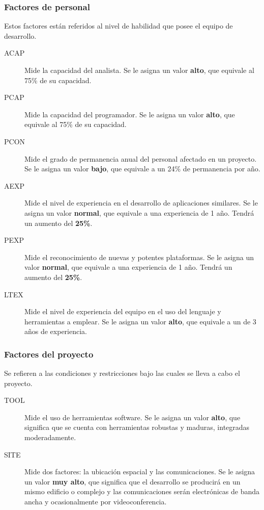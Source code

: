 \documentclass[11pt,a4paper,spanish,twoside]{book}
\begin{document}
\subsubsection{Factores de personal}
Estos factores están referidos al nivel de habilidad que posee el equipo de
desarrollo.
\begin{description}
\item[ACAP] Mide la capacidad del analista. Se le asigna un valor
\textbf{alto}, que equivale al 75\% de su capacidad.
\item[PCAP] Mide la capacidad del programador. Se le asigna un valor
\textbf{alto}, que equivale al 75\% de su capacidad.
\item[PCON] Mide el grado de permanencia anual del personal afectado en un
proyecto. Se le asigna un valor \textbf{bajo}, que equivale a un 24\% de
permanencia por año.
\item[AEXP] Mide el nivel de experiencia en el desarrollo de aplicaciones
similares. Se le asigna un valor \textbf{normal}, que equivale a una
experiencia de 1 año. Tendrá un aumento del \textbf{25\%}.
\item[PEXP] Mide el reconocimiento de nuevas y potentes plataformas. Se le
asigna un valor \textbf{normal}, que equivale a una experiencia de 1
año. Tendrá un aumento del \textbf{25\%}. 
\item[LTEX] Mide el nivel de experiencia del equipo en el uso del lenguaje y
herramientas a emplear. Se le asigna un valor \textbf{alto}, que
equivale a un de 3 años de experiencia.
\end{description}

\subsubsection{Factores del proyecto}
Se refieren a las condiciones y restricciones bajo las cuales se lleva a cabo
el proyecto.
\begin{description}
\item[TOOL] Mide el uso de herramientas software. Se le asigna un valor
\textbf{alto}, que significa que se cuenta con herramientas robustas y
maduras, integradas moderadamente.
\item[SITE] Mide dos factores: la ubicación espacial y las comunicaciones.
Se le asigna un valor \textbf{muy alto}, que significa que el desarrollo
se producirá en un mismo edificio o complejo y las comunicaciones serán
electrónicas de banda ancha y ocasionalmente por videoconferencia.
\end{description}
\end{document}
